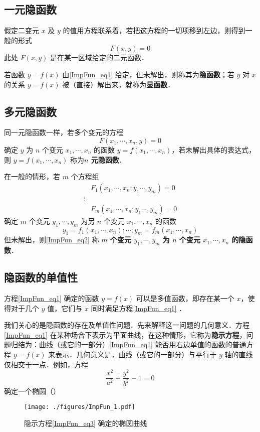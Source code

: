 
\subsection{一元隐函数}
假定二变元 $x$ 及 $y$ 的值用方程联系着，若把这方程的一切项移到左边，则得到一般的形式
\begin{equation}\label{ImpFun_eq1}
F(x,y)=0
\end{equation}
此处 $F(x,y)$ 是在某一区域给定的二元函数．

若函数 $y=f(x)$ 由\autoref{ImpFun_eq1} 给定，但未解出，则称其为\textbf{隐函数}；若 $y$ 对 $x$ 的关系 $y=f(x)$ 被（直接）解出来，就称为\textbf{显函数}．
\subsection{多元隐函数}
同一元隐函数一样，若多个变元的方程
\begin{equation}
F(x_1,\cdots,x_n,y)=0
\end{equation}
确定 $y$ 为 $n$ 个变元 $x_1,\cdots,x_n$ 的函数 $y=f(x_1,\cdots,x_n)$，若未解出具体的表达式，则 $y=f(x_1,\cdots,x_n)$ 称为\textbf{$n$ 元隐函数}． 

在一般的情形，若 $m$ 个方程组
\begin{equation}
\begin{aligned}
&F_1(x_1,\cdots,x_n;y_1\cdots,y_m)=0\\
\vdots\\
&F_m(x_1,\cdots,x_n;y_1\cdots,y_m)=0
\end{aligned}
\end{equation}
确定 $m$ 个变元 $y_1,\cdots,y_m$ 为另 $n$ 个变元 $x_1,\cdots,x_n$ 的函数
\begin{equation}\label{ImpFun_eq2}
y_1=f_1(x_1,\cdots,x_n);\cdots;y_m=f_m(x_1,\cdots,x_n)
\end{equation}
但未解出，则\autoref{ImpFun_eq2} 称\textbf{ $m$ 个变元 $y_1,\cdots,y_m$ 为 $n$ 个变元 $x_1,\cdots,x_n$ 的隐函数}． 
\subsection{隐函数的单值性}
方程\autoref{ImpFun_eq1} 确定的函数 $y=f(x)$ 可以是多值函数，即存在某一个 $x$，使得对于几个 $y$ 值，它们与 $x$ 同时满足方程\autoref{ImpFun_eq1} ．

我们关心的是隐函数的存在及单值性问题．先来解释这一问题的几何意义．方程\autoref{ImpFun_eq1} 在某种场合下表示为平面曲线，在这种情形，它称为\textbf{隐示方程}，问题归结为：曲线（或它的一部分）\autoref{ImpFun_eq1} 能否用右边单值的函数的普通方程 $y=f(x)$ 来表示．几何意义是，曲线（或它的一部分）与平行于 $y$ 轴的直线仅相交于一点．例如，方程 
\begin{equation}\label{ImpFun_eq3}
\frac{x^2}{a^2}+\frac{y^2}{b^2}-1=0
\end{equation}
确定一个椭圆（）
\begin{figure}[ht]
\centering
\texttt{[image: ./figures/ImpFun\_1.pdf]}
\caption{隐示方程\autoref{ImpFun_eq3} 确定的椭圆曲线} \label{ImpFun_fig1}
\end{figure}